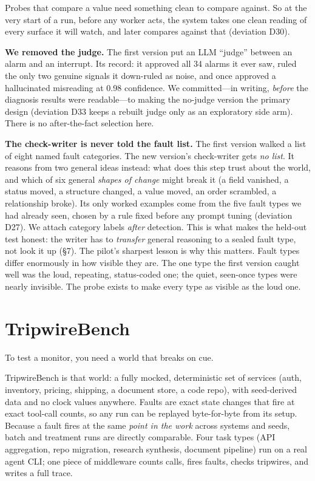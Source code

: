 \documentclass[acmsmall,screen]{acmart}
\begin{document}
Probes that compare a value need something clean to compare against. So at the
very start of a run, before any worker acts, the system takes one clean reading
of every surface it will watch, and later compares against that (deviation D30).

\textbf{We removed the judge.} The first version put an LLM ``judge'' between an
alarm and an interrupt. Its record: it approved all 34 alarms it ever saw,
ruled the only two genuine signals it down-ruled as noise, and once approved a
hallucinated misreading at 0.98 confidence. We committed---in writing,
\emph{before} the diagnosis results were readable---to making the no-judge
version the primary design (deviation D33 keeps a rebuilt judge only as an
exploratory side arm). There is no after-the-fact selection here.

\textbf{The check-writer is never told the fault list.} The first version
walked a list of eight named fault categories. The new version's check-writer
gets \emph{no list}. It reasons from two general ideas instead: what does this
step trust about the world, and which of six general \emph{shapes of change}
might break it (a field vanished, a status moved, a structure changed, a value
moved, an order scrambled, a relationship broke). Its only worked examples come
from the five fault types we had already seen, chosen by a rule fixed before any
prompt tuning (deviation D27). We attach category labels \emph{after} detection.
This is what makes the held-out test honest: the writer has to \emph{transfer}
general reasoning to a sealed fault type, not look it up (\S7). The pilot's
sharpest lesson is why this matters. Fault types differ enormously in how
visible they are. The one type the first version caught well was the loud,
repeating, status-coded one; the quiet, seen-once types were nearly invisible.
The probe exists to make every type as visible as the loud one.

\section{TripwireBench}
To test a monitor, you need a world that breaks on cue.

TripwireBench is that world: a fully mocked, deterministic set of services
(auth, inventory, pricing, shipping, a document store, a code repo), with
seed-derived data and no clock values anywhere. Faults are exact state changes
that fire at exact tool-call counts, so any run can be replayed byte-for-byte
from its setup. Because a fault fires at the same \emph{point in the work}
across systems and seeds, batch and treatment runs are directly comparable.
Four task types (API aggregation, repo migration, research synthesis, document
pipeline) run on a real agent CLI; one piece of middleware counts calls, fires
faults, checks tripwires, and writes a full trace.
\end{document}
